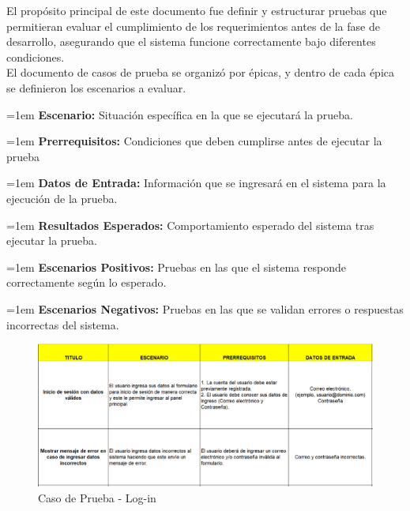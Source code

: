 \documentclass[12pt,letterpaper,spanish, xcolor=table]{report}
\numberwithin{figure}{subsection}
\begin{document}
	El propósito principal de este documento fue definir y estructurar pruebas que permitieran evaluar el cumplimiento de los requerimientos antes de la fase de desarrollo, asegurando que el sistema funcione correctamente bajo diferentes condiciones.\\
	
	El documento de casos de prueba se organizó por épicas, y dentro de cada épica se definieron los escenarios a evaluar.\\
	
	{\leftskip=1em 
	\noindent 
		\textbf{Escenario:} Situación específica en la que se ejecutará la prueba.
	\par}
	
	{\leftskip=1em 
	\noindent 
		\textbf{Prerrequisitos:} Condiciones que deben cumplirse antes de ejecutar la prueba
	\par}

	{\leftskip=1em 
	\noindent 
		\textbf{Datos de Entrada:} Información que se ingresará en el sistema para la ejecución de la prueba.
	\par}

	{\leftskip=1em 
	\noindent 
		\textbf{Resultados Esperados:} Comportamiento esperado del sistema tras ejecutar la prueba.
	\par}

	{\leftskip=1em 
	\noindent 
		\textbf{Escenarios Positivos:} Pruebas en las que el sistema responde correctamente según lo esperado.
	\par}

	{\leftskip=1em 
	\noindent 
		\textbf{Escenarios Negativos:} Pruebas en las que se validan errores o respuestas incorrectas del sistema.\\
	\par}
	
	\begin{figure}[H]
		\centering
		\includegraphics[width=1.0\textwidth]
		{Imagenes/PathAyuda/CPLogin.png}
		\caption{Caso de Prueba - Log-in 
		}\label{a2}
	\end{figure}
	
\end{document}
